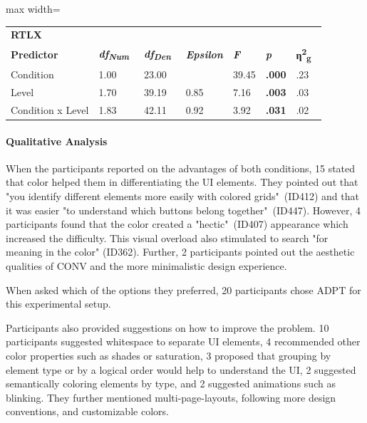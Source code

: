 \documentclass[sigconf]{nimeart}
\begin{document}
\begin{table}[htbp]\centering\small
\begin{adjustbox}{max width=\textwidth}\begin{tabular}{lllllll}
\toprule
\midrule
\multicolumn{7}{l}{%
\textbf{RTLX}} \\
\textbf{Predictor} & \textbf{\emph{df}}\textsubscript{\textbf{\emph{Num~}}} & \textbf{\emph{df}}\textsubscript{\textbf{\emph{Den~}}} & \textbf{\emph{Epsilon}} & \textbf{\emph{F}} & \textbf{\emph{p}} & \textbf{η}\textsuperscript{\textbf{2}}\textsubscript{\textbf{g~}} \\
Condition & 1.00 & 23.00 & 
 & 39.45 & \textbf{.000} & .23 \\
Level & 1.70 & 39.19 & 0.85 & 7.16 & \textbf{.003} & .03 \\
Condition x Level & 1.83 & 42.11 & 0.92 & 3.92 & \textbf{.031} & .02 \\
\bottomrule
\end{tabular}\end{adjustbox}\end{table}

\paragraph{Qualitative Analysis}\label{qualitative-analysis}

When the participants reported on the advantages of both conditions, 15 stated that color helped them in differentiating the UI elements. They pointed out that "you identify different elements more easily with colored grids"~(ID412) and that it was easier "to understand which buttons belong together"~(ID447). However, 4 participants found that the color created a "hectic"~(ID407) appearance which increased the difficulty. This visual overload also stimulated to search "for meaning in the color" (ID362). Further, 2 participants pointed out the aesthetic qualities of CONV and the more minimalistic design experience.

When asked which of the options they preferred, 20 participants chose ADPT for this experimental setup.

Participants also provided suggestions on how to improve the problem. 10 participants suggested whitespace to separate UI elements, 4 recommended other color properties such as shades or saturation, 3 proposed that grouping by element type or by a logical order would help to understand the UI, 2 suggested semantically coloring elements by type, and 2 suggested animations such as blinking. They further mentioned multi-page-layouts, following more design conventions, and customizable colors.
\end{document}
